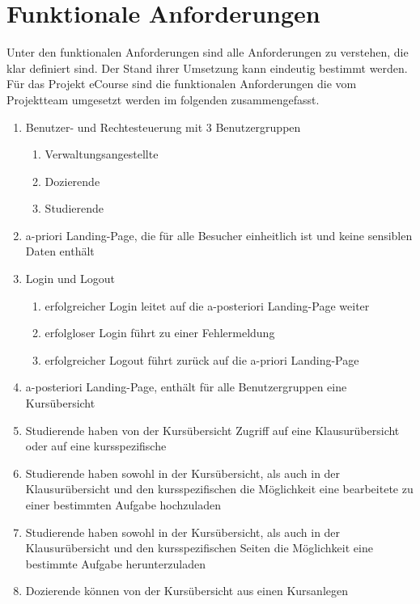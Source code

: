 
\chapter{Funktionale Anforderungen}
\label{sec:funktionale_Anforderungen}
Unter den funktionalen Anforderungen sind alle Anforderungen zu verstehen, die klar definiert sind. Der Stand ihrer Umsetzung kann eindeutig bestimmt werden. \\
Für das Projekt eCourse sind die funktionalen Anforderungen die vom Projektteam umgesetzt werden im folgenden zusammengefasst.\\
\begin{enumerate}
	\item Benutzer- und Rechtesteuerung mit 3 Benutzergruppen
	\begin{enumerate}
		\item \gls{Verwaltungsangestellte} 
		\item \gls{Dozierende}
		\item \gls{Studierende}
	\end{enumerate}
	\item a-priori \gls{Landing-Page}, die für alle Besucher einheitlich ist und keine sensiblen Daten enthält
	\item Login und Logout
	\begin{enumerate}
		\item erfolgreicher Login leitet auf die a-posteriori \gls{Landing-Page} weiter
		\item erfolgloser Login führt zu einer Fehlermeldung
		\item erfolgreicher Logout führt zurück auf die a-priori \gls{Landing-Page}
	\end{enumerate}
	\item a-posteriori \gls{Landing-Page}, enthält für alle Benutzergruppen eine Kursübersicht
	\item \gls{Studierende} haben von der Kursübersicht Zugriff auf eine Klausurübersicht oder auf eine \gls{kursspezifische}
	\item \gls{Studierende} haben sowohl in der Kursübersicht, als auch in der Klausurübersicht und den \gls{kursspezifische}n die Möglichkeit eine \gls{bearbeitete} zu einer bestimmten \gls{Aufgabe} hochzuladen
	\item \gls{Studierende} haben sowohl in der Kursübersicht, als auch in der Klausurübersicht und den \gls{kursspezifische}n Seiten die Möglichkeit eine bestimmte \gls{Aufgabe} herunterzuladen
	\item \gls{Dozierende} können von der Kursübersicht aus einen \gls{Kurs}anlegen

\end{enumerate}

